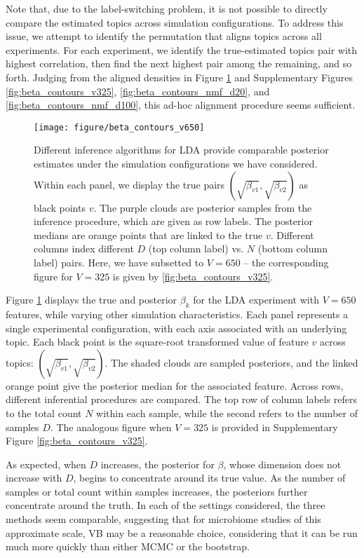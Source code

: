 \documentclass{article}
\begin{document}
Note that, due to the label-switching problem, it is not possible to directly
compare the estimated topics across simulation configurations. To address this
issue, we attempt to identify the permutation that aligns topics across all
experiments. For each experiment, we identify the true-estimated topics pair
with highest correlation, then find the next highest pair among the remaining,
and so forth. Judging from the aligned densities in Figure
\ref{fig:beta_contours_v650} and Supplementary Figures
\ref{fig:beta_contours_v325}, \ref{fig:beta_contours_nmf_d20}, and
\ref{fig:beta_contours_nmf_d100}, this ad-hoc alignment procedure seems
sufficient.

\begin{figure}[!p]
  \centering\texttt{[image: figure/beta\_contours\_v650]}
  \caption{Different inference algorithms for LDA provide comparable posterior
    estimates under the simulation configurations we have considered. Within
    each panel, we display the true pairs $\left(\sqrt{\beta_{v1}},
    \sqrt{\beta_{v2}}\right)$ as black points $v$. The purple clouds are
    posterior samples from the inference procedure, which are given as row
    labels. The posterior medians are orange points that are linked to the true
    $v$. Different columns index different $D$ (top column label) vs. $N$
    (bottom column label) pairs. Here, we have subsetted to $V = 650$ -- the
    corresponding figure for $V = 325$ is given by \ref{fig:beta_contours_v325}.
  }
  \label{fig:beta_contours_v650}
\end{figure}

Figure \ref{fig:beta_contours_v650} displays the true and posterior $\beta_{k}$
for the LDA experiment with $V = 650$ features, while varying other simulation
characteristics. Each panel represents a single experimental configuration, with
each axis associated with an underlying topic. Each black point is the
square-root transformed value of feature $v$ across topics:
$\left(\sqrt{\beta_{v1}}, \sqrt{\beta_{v2}}\right)$. The shaded clouds are
sampled posteriors, and the linked orange point give the posterior median for the
associated feature. Across rows, different inferential procedures are compared.
The top row of column labels refers to the total count $N$ within each sample,
while the second refers to the number of samples $D$. The analogous figure when
$V = 325$ is provided in Supplementary Figure \ref{fig:beta_contours_v325}.

As expected, when $D$ increases, the posterior for $\beta$, whose dimension does
not increase with $D$, begins to concentrate around its true value. As the
number of samples or total count within samples increases, the posteriors
further concentrate around the truth. In each of the settings considered, the
three methods seem comparable, suggesting that for microbiome studies of this
approximate scale, VB may be a reasonable choice, considering that it can be run
much more quickly than either MCMC or the bootstrap.
\end{document}
